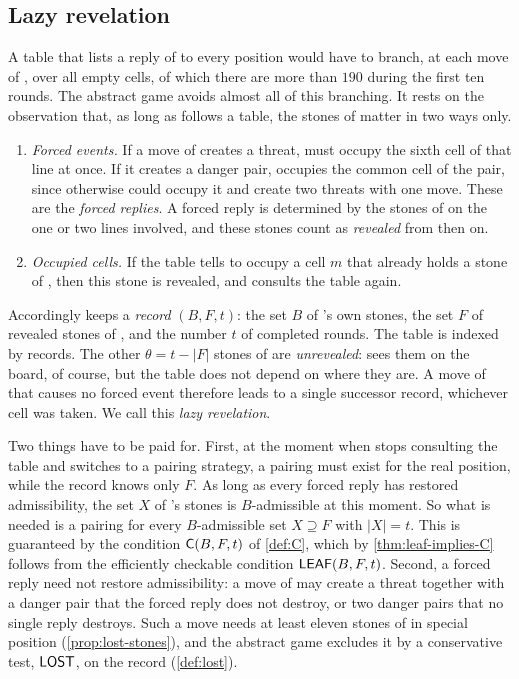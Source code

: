 \subsection{Lazy revelation}\label{sec:lazy}

A table that lists a reply of \Breaker{} to every position would have to branch, at each move of \Maker, over
all empty cells, of which there are more than $190$ during the first ten rounds. The abstract game avoids
almost all of this branching. It rests on the observation that, as long as \Breaker{} follows a table, the
stones of \Maker{} matter in two ways only.
\begin{enumerate}[label=\textup{(\roman*)},leftmargin=2.2em]
\item \emph{Forced events.} If a move of \Maker{} creates a threat, \Breaker{} must occupy the sixth cell of
  that line at once. If it creates a danger pair, \Breaker{} occupies the common cell of the pair, since
  otherwise \Maker{} could occupy it and create two threats with one move. These are the \emph{forced
  replies}. A forced reply is determined by the stones of \Maker{} on the one or two lines involved, and these
  stones count as \emph{revealed} from then on.
\item \emph{Occupied cells.} If the table tells \Breaker{} to occupy a cell $m$ that already holds a stone of
  \Maker, then this stone is revealed, and \Breaker{} consults the table again.
\end{enumerate}
Accordingly \Breaker{} keeps a \emph{record} $(B,F,t)$: the set $B$ of \Breaker's own stones, the set $F$ of
revealed stones of \Maker, and the number $t$ of completed rounds. The table is indexed by records. The other
$\theta=t-|F|$ stones of \Maker{} are \emph{unrevealed}: \Breaker{} sees them on the board, of course, but
the table does not depend on where they are. A move of \Maker{} that causes no forced event therefore leads
to a single successor record, whichever cell was taken. We call this \emph{lazy revelation}.

Two things have to be paid for. First, at the moment when \Breaker{} stops consulting the table and switches
to a pairing strategy, a pairing must exist for the real position, while the record knows only $F$. As long
as every forced reply has restored admissibility, the set $X$ of \Maker's stones is $B$-admissible at this
moment. So what is needed is a pairing for every $B$-admissible set $X\supseteq F$ with $|X|=t$. This is
guaranteed by the condition $\mathsf{C}(B,F,t)$ of \cref{def:C}, which by \cref{thm:leaf-implies-C} follows from
the efficiently checkable condition $\mathsf{LEAF}(B,F,t)$. Second, a forced reply need not restore admissibility:
a move of \Maker{} may create a threat together with a danger pair that the forced reply does not destroy,
or two danger pairs that no single reply destroys. Such a move needs at least eleven stones of \Maker{} in
special position (\cref{prop:lost-stones}), and the abstract game excludes it by a conservative
test, $\mathsf{LOST}$, on the record (\cref{def:lost}).

